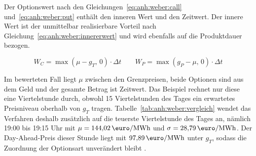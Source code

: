Der Optionswert nach den Gleichungen~\eqref{eq:anh:weber:call} und~\eqref{eq:anh:weber:put} enthält den inneren Wert und den Zeitwert. Der innere Wert ist der unmittelbar realisierbare Vorteil nach Gleichung~\eqref{eq:anh:weber:innererwert} und wird ebenfalls auf die Produktdauer bezogen.

\begin{equation}
  W_C = \max\left(\mu - g_T,\, 0\right) \cdot \Delta t
  \qquad
  W_P = \max\left(g_P - \mu,\, 0\right) \cdot \Delta t
  \label{eq:anh:weber:innererwert}
\end{equation}

Im bewerteten Fall liegt $\mu$ zwischen den Grenzpreisen, beide Optionen sind aus dem Geld und der gesamte Betrag ist Zeitwert. Das Beispiel rechnet nur diese eine Viertelstunde durch, obwohl 15 Viertelstunden des Tages ein erwartetes Preisniveau oberhalb von $g_T$ tragen. Tabelle~\ref{tab:anh:weber:vergleich} wendet das Verfahren deshalb zusätzlich auf die teuerste Viertelstunde des Tages an, nämlich 19:00 bis 19:15 Uhr mit $\mu = 144{,}02\,\si{\text{\euro}\per MWh}$ und $\sigma = 28{,}79\,\si{\text{\euro}\per MWh}$. Der Day-Ahead-Preis dieser Stunde liegt mit $97{,}89\,\si{\text{\euro}\per MWh}$ unter $g_T$, sodass die Zuordnung der Optionsart unverändert bleibt \cite{smard_marktdaten_2026}.

